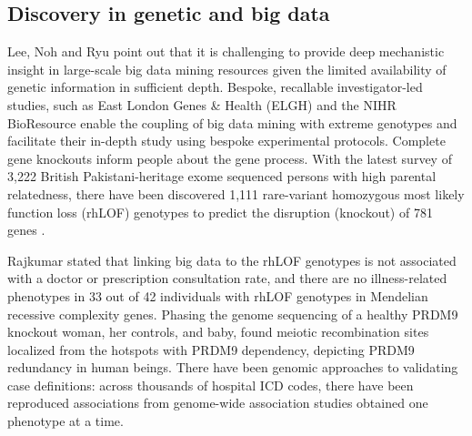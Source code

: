 \documentclass[sigconf]{acmart}
\begin{document}
\subsection{Discovery in genetic and big data}
Lee, Noh and Ryu \cite{lee2011ire1} point out that it is challenging to provide deep mechanistic insight in large-scale big data mining resources given the limited availability of genetic information in sufficient depth.
Bespoke, recallable investigator-led studies, such as East London Genes \& Health (ELGH) and the NIHR BioResource enable the coupling of big data mining with extreme genotypes and facilitate their in-depth study using bespoke experimental protocols.
Complete gene knockouts inform people about the gene process.
With the latest survey of 3,222 British Pakistani-heritage exome sequenced persons with high parental relatedness, there have been discovered 1,111 rare-variant homozygous most likely function loss (rhLOF) genotypes to predict the disruption (knockout) of 781 genes \cite{wang2005framingham}.
\par Rajkumar \cite{rajkumar2010diagnosis} stated that linking big data to the rhLOF genotypes is not associated with a doctor or prescription consultation rate, and there are no illness-related phenotypes in 33 out of 42 individuals with rhLOF genotypes in Mendelian recessive complexity genes.
Phasing the genome sequencing of a healthy PRDM9 knockout woman, her controls, and baby, found meiotic recombination sites localized from the hotspots with PRDM9 dependency, depicting PRDM9 redundancy in human beings.
There have been genomic approaches to validating case definitions: across thousands of hospital ICD codes, there have been reproduced associations from genome-wide association studies obtained one phenotype at a time.
\end{document}
